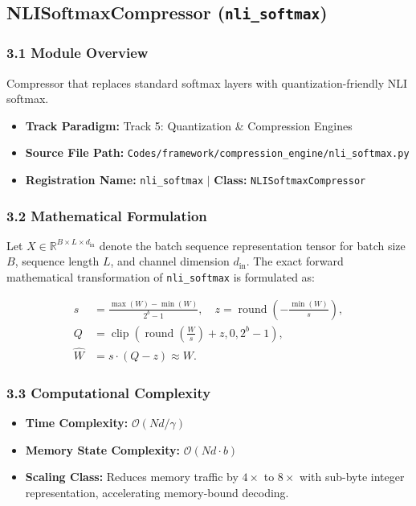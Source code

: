 \subsection{NLISoftmaxCompressor (\texttt{nli\_softmax})}
\label{sec:app_module_nli\_softmax}

\subsubsection*{3.1 Module Overview}
Compressor that replaces standard softmax layers with quantization-friendly NLI softmax.
\begin{itemize}
    \item \textbf{Track Paradigm:} Track 5: Quantization & Compression Engines
    \item \textbf{Source File Path:} \texttt{Codes/framework/compression\_engine/nli\_softmax.py}
    \item \textbf{Registration Name:} \texttt{nli\_softmax} $\mid$ \textbf{Class:} \texttt{NLISoftmaxCompressor}
\end{itemize}

\subsubsection*{3.2 Mathematical Formulation}
Let $X \in \mathbb{R}^{B \times L \times d_{\text{in}}}$ denote the batch sequence representation tensor for batch size $B$, sequence length $L$, and channel dimension $d_{\text{in}}$. The exact forward mathematical transformation of \texttt{nli\_softmax} is formulated as:

\begin{align}
s &= \frac{\max(W) - \min(W)}{2^b - 1}, \quad z = \operatorname{round}\left(-\frac{\min(W)}{s}\right), \\
Q &= \operatorname{clip}\left(\operatorname{round}\left(\frac{W}{s}\right) + z, 0, 2^b - 1\right), \\
\hat{W} &= s \cdot (Q - z) \approx W.
\end{align}


\subsubsection*{3.3 Computational Complexity}
\begin{itemize}
    \item \textbf{Time Complexity:} $\mathcal{O}(N d / \gamma)$
    \item \textbf{Memory State Complexity:} $\mathcal{O}(N d \cdot b)$
    \item \textbf{Scaling Class:} Reduces memory traffic by $4\times$ to $8\times$ with sub-byte integer representation, accelerating memory-bound decoding.
\end{itemize}

